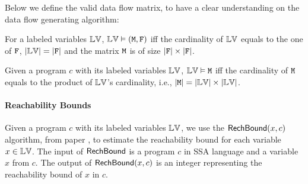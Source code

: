 %
Below we define the valid data flow matrix, to have a clear understanding on the data flow generating algorithm:
\begin{defn}
For a labeled variables $\mathbb{LV}$, $\mathbb{LV} \vDash (\mathtt{M},\mathtt{F})$ iff the cardinality of $\mathbb{LV}$ equals to the one of $\mathtt{F}$, $|\mathbb{LV}| = |\mathtt{F}|$ 
and the matrix $\mathtt{M}$ is of size $|\mathtt{F}| \times |\mathtt{F}|$.
\end{defn}
{
\begin{defn}
Given a program ${c}$ with its labeled variables $\mathbb{LV}$, 
$\mathbb{LV} \vDash \mathtt{M}$ iff the cardinality of $\mathtt{M}$ equals to the product of  $\mathbb{LV}$'s cardinality,
i.e., $|\mathtt{M}| = |\mathbb{LV}| \times |\mathbb{LV}|$.
\end{defn}
}%
%
%

%
\paragraph{Reachability Bounds}
Given a program $c$ with its labeled variables $\mathbb{LV}$,
we use the $\mathsf{RechBound}({x}, {c})$ algorithm, from paper \cite{10.1145/1806596.1806630}, to estimate the reachability bound for each variable ${x} \in \mathbb{LV}$. 
The input of $\mathsf{RechBound}$ is a program ${c}$ in SSA language and a variable ${x} $ from ${c}$.
The output of $\mathsf{RechBound}({x}, {c})$ is an integer representing the reachability bound of ${x}$ in ${c}$.
%

